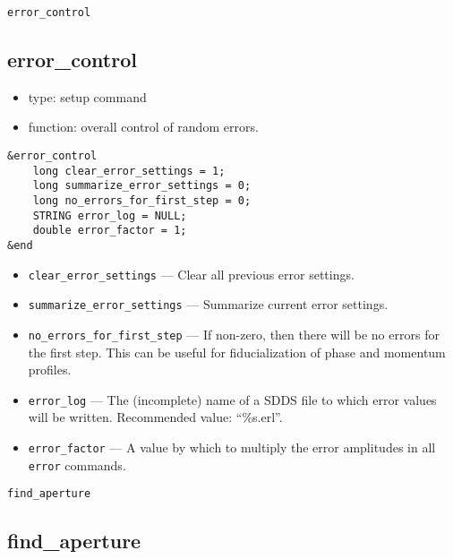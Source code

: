 \documentclass[11pt]{article}
\begin{document}
\begin{latexonly}
\newpage
\begin{center}{\Large\verb|error_control|}\end{center}
\end{latexonly}
\subsection{error\_control \label{subsec:errorcontrol}}

\begin{itemize}
\item type: setup command
\item function: overall control of random errors.
\end{itemize}

\begin{verbatim}
&error_control
    long clear_error_settings = 1;
    long summarize_error_settings = 0;
    long no_errors_for_first_step = 0;
    STRING error_log = NULL;
    double error_factor = 1;
&end
\end{verbatim}

\begin{itemize}
\item \verb|clear_error_settings| --- Clear all previous error settings.
\item \verb|summarize_error_settings| --- Summarize current error settings.
\item \verb|no_errors_for_first_step| --- If non-zero, then there will be no errors for the first step.  This can be useful for
 fiducialization of phase and momentum profiles.
\item \verb|error_log| --- The (incomplete) name of a SDDS file to which error values will be written.  Recommended value: ``\%s.erl''.
\item \verb|error_factor| --- A value by which to multiply the error amplitudes in all \verb|error| commands.
\end{itemize}

\begin{latexonly}
\newpage
\begin{center}{\Large\verb|find_aperture|}\end{center}
\end{latexonly}
\subsection{find\_aperture \label{subsec:findaperture}}
\end{document}
